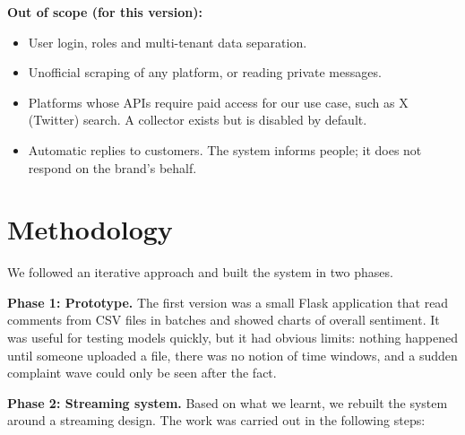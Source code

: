 \documentclass[12pt,a4paper]{report}
\begin{document}
\textbf{Out of scope (for this version):}
\begin{itemize}
    \item User login, roles and multi-tenant data separation.
    \item Unofficial scraping of any platform, or reading private messages.
    \item Platforms whose APIs require paid access for our use case, such as X (Twitter) search. A collector exists but is disabled by default.
    \item Automatic replies to customers. The system informs people; it does not respond on the brand's behalf.
\end{itemize}

\section{Methodology}

We followed an iterative approach and built the system in two phases.

\textbf{Phase 1: Prototype.} The first version was a small Flask application that read comments from CSV files in batches and showed charts of overall sentiment. It was useful for testing models quickly, but it had obvious limits: nothing happened until someone uploaded a file, there was no notion of time windows, and a sudden complaint wave could only be seen after the fact.

\textbf{Phase 2: Streaming system.} Based on what we learnt, we rebuilt the system around a streaming design. The work was carried out in the following steps:
\end{document}
